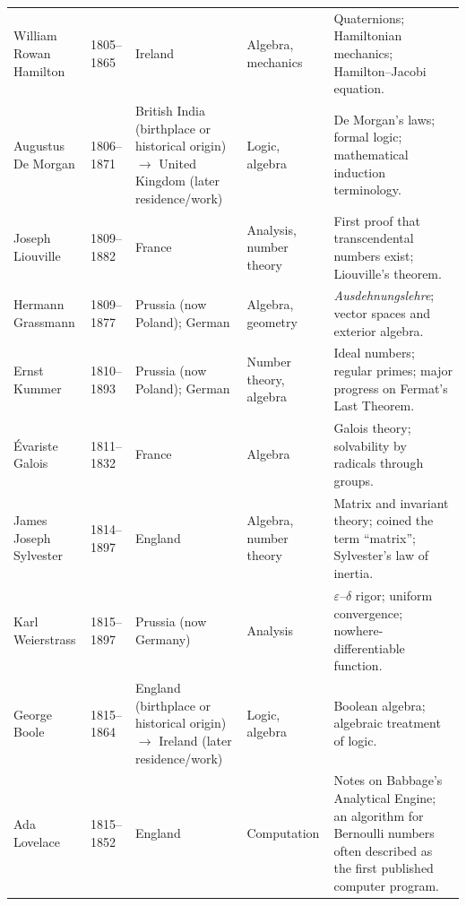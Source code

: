 {\begin{longtable}{@{}L{0.145\textwidth}L{0.09\textwidth}L{0.225\textwidth}L{0.14\textwidth}L{0.30\textwidth}@{}}
        William Rowan Hamilton
        & 1805--1865
        & Ireland
        & Algebra, mechanics
        & Quaternions; Hamiltonian mechanics; Hamilton--Jacobi equation. \\

        Augustus De Morgan
        & 1806--1871
        & British India (birthplace or historical origin) \(\to\) United Kingdom (later residence/work)
        & Logic, algebra
        & De Morgan's laws; formal logic; mathematical induction terminology. \\

        Joseph Liouville
        & 1809--1882
        & France
        & Analysis, number theory
        & First proof that transcendental numbers exist; Liouville's theorem. \\

        Hermann Grassmann
        & 1809--1877
        & Prussia (now Poland); German
        & Algebra, geometry
        & \textit{Ausdehnungslehre}; vector spaces and exterior algebra. \\

        Ernst Kummer
        & 1810--1893
        & Prussia (now Poland); German
        & Number theory, algebra
        & Ideal numbers; regular primes; major progress on Fermat's Last
          Theorem. \\

        Évariste Galois
        & 1811--1832
        & France
        & Algebra
        & Galois theory; solvability by radicals through groups. \\

        James Joseph Sylvester
        & 1814--1897
        & England
        & Algebra, number theory
        & Matrix and invariant theory; coined the term ``matrix''; Sylvester's
          law of inertia. \\

        Karl Weierstrass
        & 1815--1897
        & Prussia (now Germany)
        & Analysis
        & $\varepsilon$--$\delta$ rigor; uniform convergence; nowhere-differentiable
          function. \\

        George Boole
        & 1815--1864
        & England (birthplace or historical origin) \(\to\) Ireland (later residence/work)
        & Logic, algebra
        & Boolean algebra; algebraic treatment of logic. \\

        Ada Lovelace
        & 1815--1852
        & England
        & Computation
        & Notes on Babbage's Analytical Engine; an algorithm for Bernoulli
          numbers often described as the first published computer program. \\


\end{longtable}}
